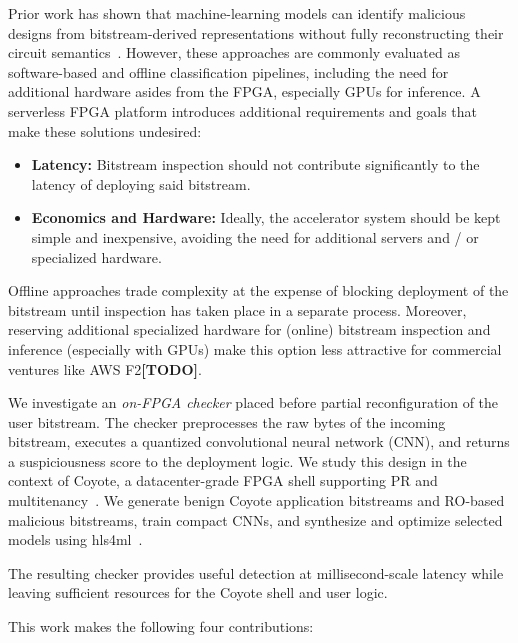 \documentclass[acmsmall]{acmart}
\newcommand{\citeTODO}{\textbf{[TODO]}}
\begin{document}
Prior work has shown that machine-learning models can identify malicious
designs from bitstream-derived representations without fully reconstructing
their circuit semantics~\cite{rettkowski2019inspection,
chaudhuri2022detection,elnaggar2023learning,palumbo2022trojan}. However, these
approaches are commonly evaluated as software-based and offline classification pipelines, including the need
for additional hardware asides from the FPGA, especially GPUs for inference\cite{chaudhuri2023detectionclassification}.
A serverless FPGA platform introduces additional requirements and goals that make these solutions undesired:
\begin{itemize}
  \item \textbf{Latency: } Bitstream inspection should not contribute significantly to the latency of deploying said bitstream.
  \item \textbf{Economics and Hardware: } Ideally, the accelerator system should be kept simple and inexpensive, avoiding the need for additional servers and / or specialized hardware.
\end{itemize}

Offline approaches trade complexity at the expense of blocking deployment of the bitstream until inspection has taken place in a separate process. Moreover, reserving additional specialized hardware for (online) bitstream
inspection and inference (especially with GPUs) make this option less attractive for commercial ventures like AWS F2\citeTODO. 

We investigate an \emph{on-FPGA checker} placed before partial
reconfiguration of the user bitstream. The checker preprocesses the raw bytes of the 
incoming bitstream, executes a quantized convolutional neural
network (CNN), and returns a suspiciousness score to the deployment logic.
We study this design in the context of Coyote, a datacenter-grade FPGA shell
supporting PR and multitenancy~\cite{ramhorst2025coyote}. We generate benign
Coyote application bitstreams and RO-based malicious bitstreams, train compact
CNNs, and synthesize and optimize selected models using
hls4ml~\cite{duarte2018fast,aarrestad2021fast}.

The resulting checker provides useful detection at millisecond-scale
latency while leaving sufficient resources for the Coyote shell and user logic.

This work makes the following four contributions:
\end{document}
